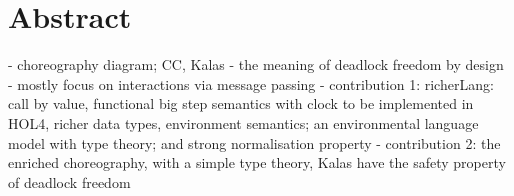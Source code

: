 \chapter*{Abstract}


- choreography diagram; CC, Kalas
- the meaning of deadlock freedom by design
- mostly focus on interactions via message passing
- contribution 1: richerLang: call by value, functional big step semantics with clock to be implemented in HOL4, richer data types, environment semantics; an environmental language model with type theory; and strong normalisation property
- contribution 2: the enriched choreography, with a simple type theory, Kalas have the safety property of deadlock freedom